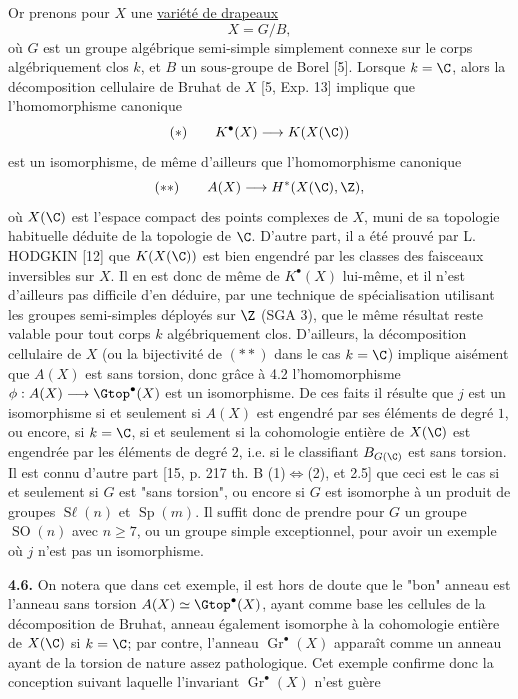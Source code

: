 
Or
prenons pour $X$ une \uline{variété de drapeaux}
\[
 X=G/B,
\]
où $G$ est un groupe algébrique semi-simple simplement connexe sur le corps algébriquement clos $k$, et $B$ un sous-groupe de Borel [5]. Lorsque $k=\C$, alors la décomposition cellulaire de Bruhat de $X$ [5, Exp. 13] implique que l'homomorphisme canonique
\[
 (*)\qquad K^\bullet(X)\longrightarrow K(X(\C))
\]
est un isomorphisme, de même d'ailleurs que l'homomorphisme canonique
\[
 (**)\qquad A(X)\longrightarrow H^*(X(\C),\Z),
\]
où $X(\C)$ est l'espace compact des points complexes de $X$, muni de sa topologie habituelle déduite de la topologie de $\C$. D'autre part, il a été prouvé par L. HODGKIN [12] que $K(X(\C))$ est bien engendré par les classes des faisceaux inversibles sur $X$. Il en est donc de même de $K^\bullet(X)$ lui-même, et il n'est d'ailleurs pas difficile d'en déduire, par une technique de spécialisation utilisant les groupes semi-simples déployés sur $\Z$ (SGA 3), que le même résultat reste valable pour tout corps $k$ algébriquement clos. D'ailleurs, la décomposition cellulaire de $X$ (ou la bijectivité de $(**)$ dans le cas $k=\C$) implique aisément que $A(X)$ est sans torsion, donc grâce à 4.2 l'homomorphisme $\phi:A(X)\longrightarrow\Gtop^\bullet(X)$ est un isomorphisme. De ces faits il résulte que $j$ est un isomorphisme si et seulement si $A(X)$ est engendré par ses éléments de degré $1$, ou encore, si $k=\C$, si et seulement si la cohomologie entière de $X(\C)$ est engendrée par les éléments de degré $2$, i.e. si le classifiant $B_{G(\C)}$ est sans torsion. Il est connu d'autre part [15, p. 217 th. B (1)$\Leftrightarrow$(2), et 2.5] que ceci est le cas si et seulement si $G$ est "sans torsion", ou encore si $G$ est isomorphe à un produit de groupes $\operatorname{S\ell}(n)$ et $\operatorname{Sp}(m)$. Il suffit donc de prendre pour $G$ un groupe $\operatorname{SO}(n)$ avec $n\geq 7$, ou un groupe simple exceptionnel, pour avoir un exemple où $j$ n'est pas un isomorphisme.

\textbf{4.6.} On notera que dans cet exemple, il est hors de doute que le "bon" anneau est l'anneau sans torsion $A(X)\simeq\Gtop^\bullet(X)$, ayant comme base les cellules de la décomposition de Bruhat, anneau également isomorphe à la cohomologie entière de $X(\C)$ si $k=\C$; par contre, l'anneau $\operatorname{Gr}^\bullet(X)$ apparaît comme un anneau ayant de la torsion de nature assez pathologique. Cet exemple confirme donc la conception suivant laquelle l'invariant $\operatorname{Gr}^\bullet(X)$ n'est guère
